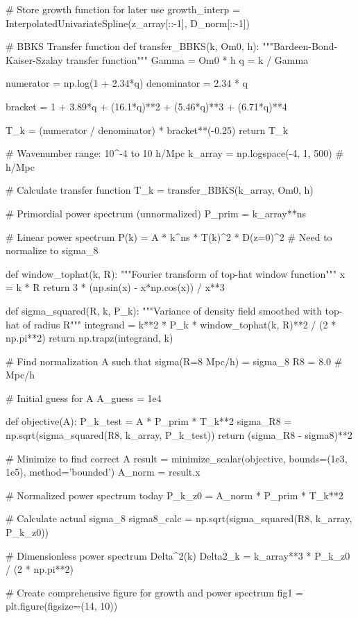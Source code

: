 \documentclass[a4paper, 11pt]{article}
\begin{document}
\begin{pycode}
# Store growth function for later use
growth_interp = InterpolatedUnivariateSpline(z_array[::-1], D_norm[::-1])

# BBKS Transfer function
def transfer_BBKS(k, Om0, h):
    """Bardeen-Bond-Kaiser-Szalay transfer function"""
    Gamma = Om0 * h
    q = k / Gamma

    numerator = np.log(1 + 2.34*q)
    denominator = 2.34 * q

    bracket = 1 + 3.89*q + (16.1*q)**2 + (5.46*q)**3 + (6.71*q)**4

    T_k = (numerator / denominator) * bracket**(-0.25)
    return T_k

# Wavenumber range: 10^-4 to 10 h/Mpc
k_array = np.logspace(-4, 1, 500)  # h/Mpc

# Calculate transfer function
T_k = transfer_BBKS(k_array, Om0, h)

# Primordial power spectrum (unnormalized)
P_prim = k_array**ns

# Linear power spectrum P(k) = A * k^ns * T(k)^2 * D(z=0)^2
# Need to normalize to sigma_8

def window_tophat(k, R):
    """Fourier transform of top-hat window function"""
    x = k * R
    return 3 * (np.sin(x) - x*np.cos(x)) / x**3

def sigma_squared(R, k, P_k):
    """Variance of density field smoothed with top-hat of radius R"""
    integrand = k**2 * P_k * window_tophat(k, R)**2 / (2 * np.pi**2)
    return np.trapz(integrand, k)

# Find normalization A such that sigma(R=8 Mpc/h) = sigma_8
R8 = 8.0  # Mpc/h

# Initial guess for A
A_guess = 1e4

def objective(A):
    P_k_test = A * P_prim * T_k**2
    sigma_R8 = np.sqrt(sigma_squared(R8, k_array, P_k_test))
    return (sigma_R8 - sigma8)**2

# Minimize to find correct A
result = minimize_scalar(objective, bounds=(1e3, 1e5), method='bounded')
A_norm = result.x

# Normalized power spectrum today
P_k_z0 = A_norm * P_prim * T_k**2

# Calculate actual sigma_8
sigma8_calc = np.sqrt(sigma_squared(R8, k_array, P_k_z0))

# Dimensionless power spectrum Delta^2(k)
Delta2_k = k_array**3 * P_k_z0 / (2 * np.pi**2)

# Create comprehensive figure for growth and power spectrum
fig1 = plt.figure(figsize=(14, 10))


\end{pycode}
\end{document}
